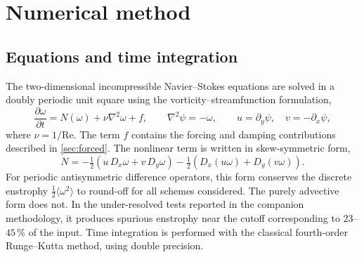 \documentclass[11pt,a4paper]{article}
\newcommand{\Rey}{\mathrm{Re}}
\begin{document}
\section{Numerical method}
\label{sec:method}
\subsection{Equations and time integration}
The two-dimensional incompressible Navier--Stokes equations are solved in a doubly periodic unit square using the vorticity--streamfunction formulation,
\begin{equation}
\frac{\partial\omega}{\partial t}=N(\omega)+\nu\nabla^2\omega+f,\qquad
\nabla^2\psi=-\omega,\qquad u=\partial_y\psi,\quad v=-\partial_x\psi,
\end{equation}
where $\nu=1/\Rey$. The term $f$ contains the forcing and damping contributions described in \cref{sec:forced}. The nonlinear term is written in skew-symmetric form,
\begin{equation}
N=-\tfrac12\left(u\,D_x\omega+v\,D_y\omega\right)
  -\tfrac12\left(D_x(u\omega)+D_y(v\omega)\right).
\label{eq:skew}
\end{equation}
For periodic antisymmetric difference operators, this form conserves the discrete enstrophy $\tfrac12\langle\omega^2\rangle$ to round-off for all schemes considered. The purely advective form does not. In the under-resolved tests reported in the companion methodology, it produces spurious enstrophy near the cutoff corresponding to $23$--$45\,\%$ of the input. Time integration is performed with the classical fourth-order Runge--Kutta method, using double precision.
\end{document}
